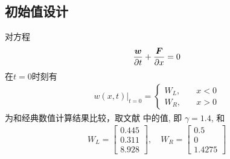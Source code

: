 \documentclass[10.5pt
]{article}
\begin{document}
\subsection{初始值设计}
对方程
\begin{align}
\frac{\vb*w}{\partial t} + \frac{\vb*F}{\partial x} = 0
\end{align}
在$t = 0$时刻有
\begin{align}
w(x,t)|_{t=0} = \left\{ \begin{array}{ll}
W_L, & \quad x < 0 \\
W_R, & \quad x > 0
\end{array} \right.
\end{align}
为和经典数值计算结果比较，取文献 \citet{Harten1983} 中的值, 即 $\gamma=1.4$, 和
\begin{align}
    W_L = \left[\begin{array}{l}
    0.445\\
    0.311\\
    8.928
    \end{array}\right], \quad W_R = \left[\begin{array}{l}
    0.5\\
    0\\
    1.4275
    \end{array}\right]
\end{align}
\end{document}
